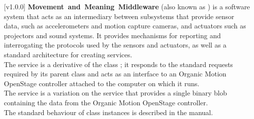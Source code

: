 [v1.0.0]
\textbf{Movement~and~Meaning~Middleware} (also known as \mplusm) is a software system
that acts as an intermediary between subsystems that provide sensor data, such as
accelerometers and motion capture cameras, and actuators such as projectors and sound
systems.
It provides mechanisms for reporting and interrogating the protocols used by the sensors
and actuators, as well as a standard architecture for creating services.\\

The \OSI{} service is a derivative of the \mplusm{} class ;
it responds to the standard requests required by its parent class and acts as an interface
to an Organic Motion OpenStage controller attached to the computer on which it runs.\\

The \OSBI{} service is a variation on the \OSI{} service that provides a single binary
blob containing the data from the Organic Motion OpenStage controller.\\

The standard behaviour of  class instances is described in
the \emph{\MMM} manual.
\primaryEnd{}
